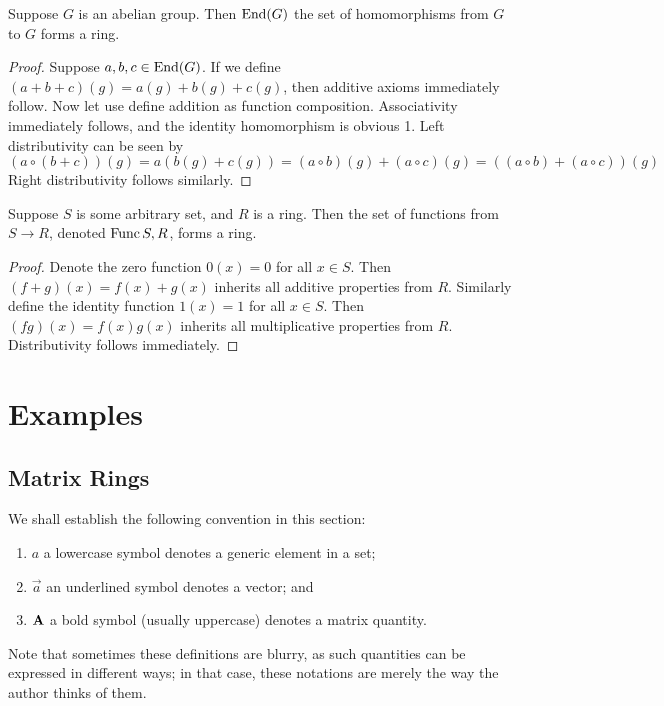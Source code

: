 \begin{proposition}
    Suppose \(G\) is an abelian group.
    Then \(\operatorname{End}(G)\) the set of homomorphisms from \(G\) to \(G\)
    forms a ring.
\end{proposition}
\begin{proof}
    Suppose \(a,b,c \in \operatorname{End}(G)\).
    If we define \((a+b+c)(g) = a(g)+b(g)+c(g)\),
    then additive axioms immediately follow.
    Now let use define addition as function composition.
    Associativity immediately follows,
    and the identity homomorphism is obvious 1.
    Left distributivity can be seen by
    \begin{equation*}
        (a\circ(b+c))(g) = a(b(g)+c(g))
        = (a \circ b)(g) + (a \circ c)(g)
        = ((a \circ b) + (a \circ c))(g)
    \end{equation*}
    Right distributivity follows similarly.
\end{proof}

\begin{lemma}
    Suppose \(S\) is some arbitrary set, and \(R\) is a ring.
    Then the set of functions from \(S \to R\), denoted \(\operatorname{Func}{S,R}\),
    forms a ring.
\end{lemma}
\begin{proof}
    Denote the zero function \(0(x) = 0\) for all \(x \in S\).
    Then \((f+g)(x) = f(x) + g(x)\) inherits all additive properties from \(R\).
    Similarly define the identity function \(1(x) = 1\) for all \(x \in S\).
    Then \((fg)(x) = f(x)g(x)\) inherits all multiplicative properties from \(R\).
    Distributivity follows immediately.
\end{proof}


\section{Examples}\label{sec:matrix-rings}

\subsection*{Matrix Rings}

\begin{remark}
    We shall establish the following convention in this section:
    \begin{enumerate}[label={(\roman*)}, itemsep=0mm]
        \item \(a\) a lowercase symbol denotes a generic element in a set;
        \item \(\vec{a}\) an underlined symbol denotes a vector; and
        \item \(\vb{A}\) a bold symbol (usually uppercase)
            denotes a matrix quantity.
    \end{enumerate}
    Note that sometimes these definitions are blurry,
    as such quantities can be expressed in different ways;
    in that case, these notations are merely the way the author thinks of them.
\end{remark}

